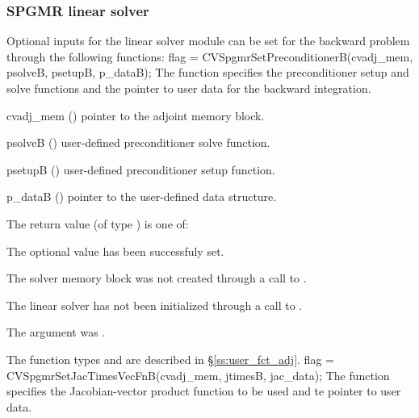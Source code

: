 \subsubsection{SPGMR linear solver}
Optional inputs for the {\cvspgmr} linear solver module can be set for the backward
problem through the following functions:
{
  flag = CVSpgmrSetPreconditionerB(cvadj\_mem, psolveB, psetupB, p\_dataB);
}
{
  The function  specifies the preconditioner
  setup and solve functions and the pointer to user data for the backward integration.
}
{
  \begin{args}
  \item[cvadj\_mem] ()
    pointer to the adjoint memory block.
  \item[psolveB] ()
    user-defined preconditioner solve function.
  \item[psetupB] ()
    user-defined preconditioner setup function.
  \item[p\_dataB] ()
     pointer to the user-defined data structure.
  \end{args}
}
{
  The return value  (of type ) is one of:
  \begin{args}
  \item[\Id{CVSPGMR\_SUCCESS}] 
    The optional value has been successfuly set.
  \item[\Id{CVSPGMR\_MEM\_NULL}]
    The {\cvodes} solver memory block was not created through a call to .
  \item[\Id{CVSPGMR\_LMEM\_NULL}]
    The {\cvspgmr} linear solver has not been initialized through a call to .
  \item[\Id{CVSPGMR\_ADJMEM\_NULL}]
    The  argument was .
  \end{args}
}
{
   The function types  and  are
   described in \S\ref{ss:user_fct_adj}.
}
{
  flag = CVSpgmrSetJacTimesVecFnB(cvadj\_mem, jtimesB, jac\_data);
}
{
  The function  specifies the Jacobian-vector 
  product function to be used and te pointer to user data.
}
